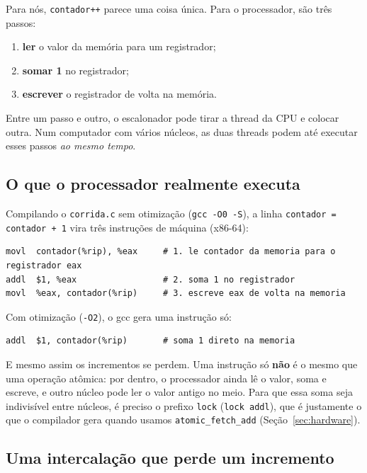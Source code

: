 \documentclass[11pt,a4paper]{article}
\newcommand{\cmd}[1]{\texttt{#1}}
\begin{document}
Para nós, \cmd{contador++} parece uma coisa única. Para o processador, são três passos:

\begin{enumerate}
    \item \textbf{ler} o valor da memória para um registrador;
    \item \textbf{somar 1} no registrador;
    \item \textbf{escrever} o registrador de volta na memória.
\end{enumerate}

Entre um passo e outro, o escalonador pode tirar a thread da CPU e colocar outra. Num computador com vários núcleos, as duas threads podem até executar esses passos \emph{ao mesmo tempo}.

\subsection{O que o processador realmente executa}

Compilando o \cmd{corrida.c} sem otimização (\cmd{gcc -O0 -S}), a linha \cmd{contador = contador + 1} vira três instruções de máquina (x86-64):

\begin{lstlisting}[style=terminal]
movl  contador(%rip), %eax     # 1. le contador da memoria para o registrador eax
addl  $1, %eax                 # 2. soma 1 no registrador
movl  %eax, contador(%rip)     # 3. escreve eax de volta na memoria
\end{lstlisting}

Com otimização (\cmd{-O2}), o gcc gera uma instrução só:

\begin{lstlisting}[style=terminal]
addl  $1, contador(%rip)       # soma 1 direto na memoria
\end{lstlisting}

E mesmo assim os incrementos se perdem. Uma instrução só \textbf{não} é o mesmo que uma operação atômica: por dentro, o processador ainda lê o valor, soma e escreve, e outro núcleo pode ler o valor antigo no meio. Para que essa soma seja indivisível entre núcleos, é preciso o prefixo \cmd{lock} (\cmd{lock addl}), que é justamente o que o compilador gera quando usamos \cmd{atomic\_fetch\_add} (Seção~\ref{sec:hardware}).

\subsection{Uma intercalação que perde um incremento}\label{sec:intercalacao}
\end{document}
